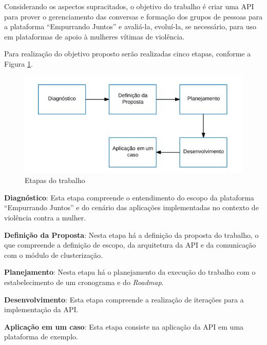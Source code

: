Considerando os aspectos supracitados, o objetivo do trabalho é criar uma API para prover o gerenciamento das conversas e formação
dos grupos de pessoas para a plataforma ``Empurrando Juntos'' e avaliá-la, evoluí-la, se necessário, para uso 
em plataformas de apoio à mulheres vítimas de violência.



Para realização do objetivo proposto serão realizadas cinco etapas, conforme a Figura \ref{fig:etapas_trabalho}.

\begin{figure}[h!]
\centering
\includegraphics[scale=0.6]{figuras/etapas.png}
\caption{Etapas do trabalho}
\label{fig:etapas_trabalho}
\end{figure}

\noindent \textbf{Diagnóstico}: Esta etapa compreende o entendimento do escopo da plataforma ``Empurrando Juntos'' e do cenário das 
aplicações implementadas no contexto de violência contra a mulher.

\noindent \textbf{Definição da Proposta}: Nesta etapa há a definição da proposta do trabalho, o que compreende a definição de escopo, 
da arquitetura da API e da comunicação com o módulo de clusterização.

\noindent \textbf{Planejamento}: Nesta etapa há o planejamento da execução do trabalho com o estabelecimento
de um cronograma e do \textit{Roadmap}.

\noindent \textbf{Desenvolvimento}: Esta etapa compreende a realização de iterações para a implementação da API.

\noindent \textbf{Aplicação em um caso}: Esta etapa consiste na aplicação da API em uma plataforma de exemplo.

